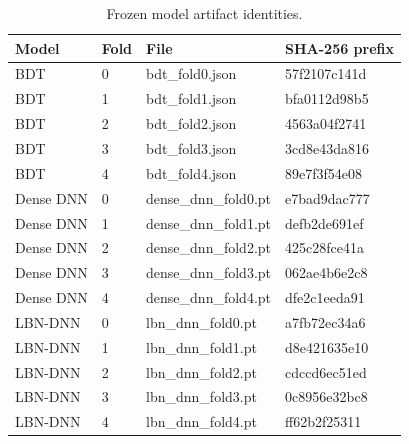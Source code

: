 \begin{table}[tb]
  \centering
  \footnotesize
  \caption{Frozen model artifact identities.}
  \label{tab:model-artifacts}
  \begin{tabular}{llll}
    \toprule
    Model & Fold & File & SHA-256 prefix \\
    \midrule
    BDT & 0 & bdt\_fold0.json & 57f2107c141d \\
    BDT & 1 & bdt\_fold1.json & bfa0112d98b5 \\
    BDT & 2 & bdt\_fold2.json & 4563a04f2741 \\
    BDT & 3 & bdt\_fold3.json & 3cd8e43da816 \\
    BDT & 4 & bdt\_fold4.json & 89e7f3f54e08 \\
    Dense DNN & 0 & dense\_dnn\_fold0.pt & e7bad9dac777 \\
    Dense DNN & 1 & dense\_dnn\_fold1.pt & defb2de691ef \\
    Dense DNN & 2 & dense\_dnn\_fold2.pt & 425c28fce41a \\
    Dense DNN & 3 & dense\_dnn\_fold3.pt & 062ae4b6e2c8 \\
    Dense DNN & 4 & dense\_dnn\_fold4.pt & dfe2c1eeda91 \\
    LBN-DNN & 0 & lbn\_dnn\_fold0.pt & a7fb72ec34a6 \\
    LBN-DNN & 1 & lbn\_dnn\_fold1.pt & d8e421635e10 \\
    LBN-DNN & 2 & lbn\_dnn\_fold2.pt & cdccd6ec51ed \\
    LBN-DNN & 3 & lbn\_dnn\_fold3.pt & 0c8956e32bc8 \\
    LBN-DNN & 4 & lbn\_dnn\_fold4.pt & ff62b2f25311 \\
    \bottomrule
  \end{tabular}
\end{table}
